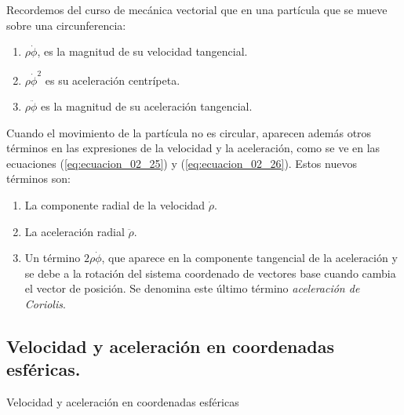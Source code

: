 \documentclass[12pt]{article}
\begin{document}
Recordemos del curso de mecánica vectorial que en una partícula que se mueve sobre una circunferencia:
\begin{enumerate}[label=\alph*)]
\item $\rho \dot{\phi}$, es la magnitud de su velocidad tangencial.
\item $\rho \dot{\phi}^{2}$ es su aceleración centrípeta.
\item $\rho \ddot{\phi}$ es la magnitud de su aceleración tangencial.
\end{enumerate}
Cuando el movimiento de la partícula no es circular, aparecen además otros términos en las expresiones de la velocidad y la aceleración, como se ve en las ecuaciones (\ref{eq:ecuacion_02_25}) y (\ref{eq:ecuacion_02_26}). Estos nuevos términos son:
\begin{enumerate}[label=\roman*)]
\item La componente radial de la velocidad $\dot{\rho}$.
\item La aceleración radial $\ddot{\rho}$.
\item Un término $2 \rho \dot{\phi}$, que aparece en la componente tangencial de la aceleración y se debe a la rotación del sistema coordenado de vectores base cuando cambia el vector de posición. Se denomina este último término \emph{aceleración de Coriolis}.
\end{enumerate}

\subsection{Velocidad y aceleración en coordenadas esféricas.}

Velocidad y aceleración en coordenadas esféricas 
\end{document}
